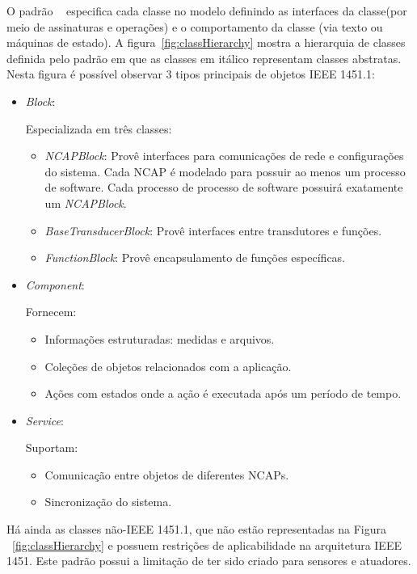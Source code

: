 O padrão ~\cite{ieee1451standard} especifica cada classe no modelo definindo as interfaces da classe(por meio de assinaturas e operações) e o comportamento da classe (via texto ou máquinas de estado). A figura~\ref{fig:classHierarchy} mostra a hierarquia de classes definida pelo padrão em que as classes em itálico representam classes abstratas. Nesta figura é possível observar 3 tipos principais de objetos IEEE 1451.1:

\begin{itemize}
	\item\emph{Block}:

	Especializada em três classes:
		\begin{itemize}
			\item\emph{NCAPBlock}:
				Provê interfaces para comunicações de rede e configurações do sistema. Cada NCAP é modelado para possuir ao menos um processo de software. Cada processo de processo de software possuirá exatamente um \emph{NCAPBlock}.
			\item\emph{BaseTransducerBlock}:
				Provê interfaces entre transdutores e funções.
			\item\emph{FunctionBlock}:
				Provê encapsulamento de funções específicas.
		\end{itemize}
	
	\item\emph{Component}:
	
		Fornecem:
		\begin{itemize}
			\item Informações estruturadas: medidas e arquivos.
			\item Coleções de objetos relacionados com a aplicação.
			\item Ações com estados onde a ação é executada após um período de tempo.
		\end{itemize}
	\item\emph{Service}:
	
		Suportam:
		\begin{itemize}
			\item Comunicação entre objetos de diferentes NCAPs.
			\item Sincronização do sistema.
		\end{itemize}
\end{itemize}

Há ainda as classes não-IEEE 1451.1, que não estão representadas na Figura ~\ref{fig:classHierarchy} e possuem restrições de aplicabilidade na arquitetura IEEE 1451. Este padrão possui a limitação de ter sido criado para sensores e atuadores.


